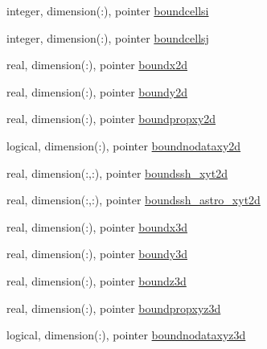 \begin{DoxyCompactItemize}
\item 
integer, dimension(\+:), pointer \mbox{\hyperlink{structmoduledelft3d__2__mohid_1_1t__delft3d__2__mohid_a32bd590f069507677d0b906fa41836b7}{boundcellsi}}
\item 
integer, dimension(\+:), pointer \mbox{\hyperlink{structmoduledelft3d__2__mohid_1_1t__delft3d__2__mohid_a4a3270d47a426eca095ab85e8a33f690}{boundcellsj}}
\item 
real, dimension(\+:), pointer \mbox{\hyperlink{structmoduledelft3d__2__mohid_1_1t__delft3d__2__mohid_a40a6e8a73b28635b3a73d8bd9bbced58}{boundx2d}}
\item 
real, dimension(\+:), pointer \mbox{\hyperlink{structmoduledelft3d__2__mohid_1_1t__delft3d__2__mohid_a95ad2c72654371fd639cea3ee0dda324}{boundy2d}}
\item 
real, dimension(\+:), pointer \mbox{\hyperlink{structmoduledelft3d__2__mohid_1_1t__delft3d__2__mohid_aec77175228d43af81aafa89285f387ab}{boundpropxy2d}}
\item 
logical, dimension(\+:), pointer \mbox{\hyperlink{structmoduledelft3d__2__mohid_1_1t__delft3d__2__mohid_a89b65cd093e295eceb8a78846017fbfe}{boundnodataxy2d}}
\item 
real, dimension(\+:,\+:), pointer \mbox{\hyperlink{structmoduledelft3d__2__mohid_1_1t__delft3d__2__mohid_a6d128c6d788fdd2d3a3ad2f7766a2fc8}{boundssh\+\_\+xyt2d}}
\item 
real, dimension(\+:,\+:), pointer \mbox{\hyperlink{structmoduledelft3d__2__mohid_1_1t__delft3d__2__mohid_a13c21f5e9342ef05631013eaaf158e3a}{boundssh\+\_\+astro\+\_\+xyt2d}}
\item 
real, dimension(\+:), pointer \mbox{\hyperlink{structmoduledelft3d__2__mohid_1_1t__delft3d__2__mohid_afb9952bbe1812614b63e4185d8bbe737}{boundx3d}}
\item 
real, dimension(\+:), pointer \mbox{\hyperlink{structmoduledelft3d__2__mohid_1_1t__delft3d__2__mohid_ab015f603aad7ad6faea7f3399b673f5f}{boundy3d}}
\item 
real, dimension(\+:), pointer \mbox{\hyperlink{structmoduledelft3d__2__mohid_1_1t__delft3d__2__mohid_aa75c0b44ea55dfdc593a578175d2eb72}{boundz3d}}
\item 
real, dimension(\+:), pointer \mbox{\hyperlink{structmoduledelft3d__2__mohid_1_1t__delft3d__2__mohid_a0808db6b02b86e138f75c09bca4ac405}{boundpropxyz3d}}
\item 
logical, dimension(\+:), pointer \mbox{\hyperlink{structmoduledelft3d__2__mohid_1_1t__delft3d__2__mohid_a7ff2792b089217930a46a7bacc9bb6fd}{boundnodataxyz3d}}

\end{DoxyCompactItemize}
